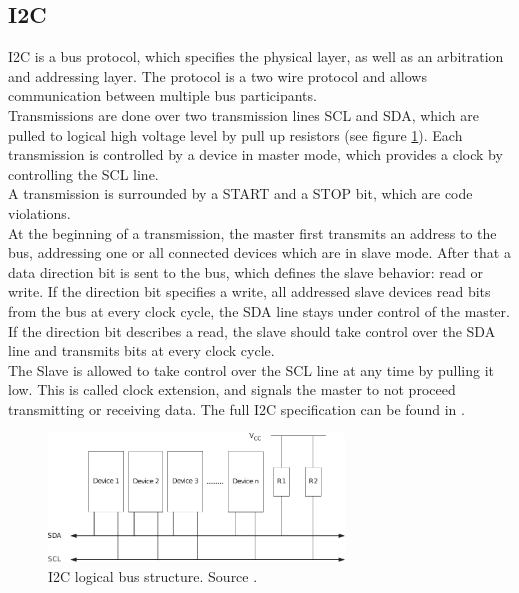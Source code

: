 \documentclass[a4paper]{scrreprt}
\begin{document}
\subsection{I2C}
I2C is a bus protocol, which specifies the physical layer, as well as an arbitration and addressing layer. The protocol is a two wire protocol and allows communication between multiple bus participants.\\
Transmissions are done over two transmission lines SCL and SDA, which
are pulled to logical high voltage level by pull up resistors (see
figure \ref{fig:i2c}). Each transmission is controlled by a device
in master mode, which provides a clock by controlling the SCL line.\\
A transmission is surrounded by a START and a STOP bit, which are code violations.\\
At the beginning of a transmission, the master first transmits an
address to the bus, addressing one or all connected devices which
are in slave mode. After that a data direction bit is sent to the
bus, which defines the slave behavior: read or write. If the direction bit specifies a write, all addressed slave devices read bits from the bus at every 
clock cycle, the SDA line stays under control of the master. If the
direction bit describes a read, the slave should take control over
the SDA line and transmits bits at every clock cycle.\\
The Slave is allowed to take control over the SCL line at any time
by pulling it low. This is called clock extension, and signals the
master to not proceed transmitting or receiving data.
The full I2C specification can be found in \cite{i2c}.
\begin{figure}[Hh!]
	\centering
	\includegraphics[width=0.7\textwidth]{img/i2c.pdf}
  \caption{I2C logical bus structure. Source \cite{i2c}.}
	\label{fig:i2c}
\end{figure}
\end{document}
